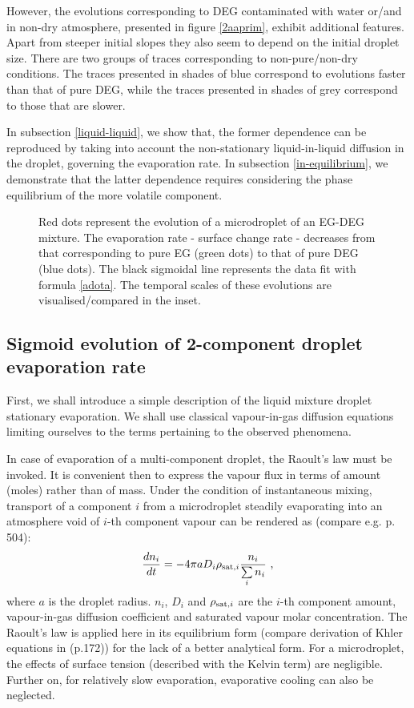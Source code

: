 \documentclass[twoside,twocolumn,9pt]{article}
\begin{document}
However, the evolutions corresponding to DEG contaminated with water or/and in non-dry atmosphere, presented in figure \ref{2aaprim}, exhibit additional features. Apart from steeper initial slopes they also seem to depend on the initial droplet size. There are two groups of traces corresponding to non-pure/non-dry conditions. The traces presented in shades of blue correspond to evolutions faster than that of pure DEG, while the traces presented in shades of grey correspond to those that are slower.

In subsection \ref{liquid-liquid}, we show that, the former dependence can be reproduced by taking into account the non-stationary liquid-in-liquid diffusion in the droplet, governing the evaporation rate. In subsection \ref{in-equilibrium}, we demonstrate that the latter dependence requires considering the phase equilibrium of the more volatile component. 

\begin{figure}[htb]
 \centering
 \caption{Red dots represent the evolution of a microdroplet of an EG-DEG mixture. The evaporation rate - surface change rate - decreases from that corresponding to pure EG (green dots) to that of pure DEG (blue dots). The black sigmoidal line represents the data fit with formula \ref{adota}. The temporal scales of these evolutions are visualised/compared in the inset.}
 \label{2liquids}
\end{figure}

\subsection{Sigmoid evolution of 2-component droplet evaporation rate} \label{stationary->sigmoid}

First, we shall introduce a simple description of the liquid mixture droplet stationary evaporation. We shall use classical vapour-in-gas diffusion equations limiting ourselves to the terms pertaining to the observed phenomena.

In case of evaporation of a multi-component droplet, the Raoult's law must be invoked. It is convenient then to express the vapour flux in terms of amount (moles) rather than of mass. Under the condition of instantaneous mixing, transport of a component $i$ from a microdroplet steadily evaporating into an atmosphere void of $i$-th component vapour can be rendered as (compare e.g. \cite{Pruppacher} p. 504):
\begin{equation}
  \frac{dn_i}{dt} = -4\pi a D_i\rho_{{\rm sat},i} \frac{n_i}{\sum\limits_{i} n_i} \mbox{~,}
  \label{i-th_component}
\end{equation}
where $a$ is the droplet radius. $n_i$, $D_i$ and $\rho_{{\rm sat},i}$ are the $i$-th component amount, vapour-in-gas diffusion coefficient and saturated vapour molar concentration. The Raoult's law is applied here in its equilibrium form (compare derivation of Khler equations in \cite{Pruppacher} (p.172)) for the lack of a better analytical form. For a microdroplet, the effects of surface tension (described with the Kelvin term) are negligible. Further on, for relatively slow evaporation, evaporative cooling can also be neglected.
\end{document}
